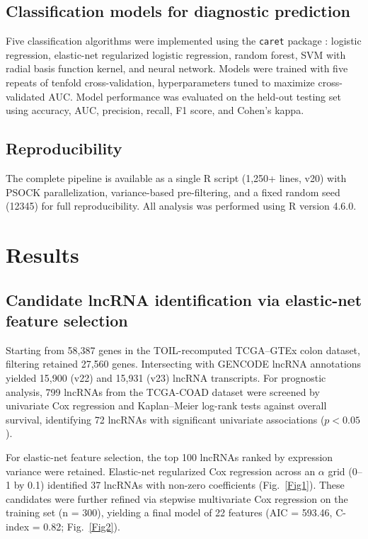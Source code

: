 \documentclass[11pt,a4paper]{article}
\begin{document}
\subsection{Classification models for diagnostic prediction}

Five classification algorithms were implemented using the \texttt{caret} package \citep{RN16}: logistic regression, elastic-net regularized logistic regression, random forest, SVM with radial basis function kernel, and neural network. Models were trained with five repeats of tenfold cross-validation, hyperparameters tuned to maximize cross-validated AUC. Model performance was evaluated on the held-out testing set using accuracy, AUC, precision, recall, F1 score, and Cohen's kappa.

\subsection{Reproducibility}

The complete pipeline is available as a single R script (1,250+ lines, v20) with PSOCK parallelization, variance-based pre-filtering, and a fixed random seed (12345) for full reproducibility. All analysis was performed using R version 4.6.0.

\section{Results}

\subsection{Candidate lncRNA identification via elastic-net feature selection}

Starting from 58,387 genes in the TOIL-recomputed TCGA--GTEx colon dataset, filtering retained 27,560 genes. Intersecting with GENCODE lncRNA annotations yielded 15,900 (v22) and 15,931 (v23) lncRNA transcripts. For prognostic analysis, 799 lncRNAs from the TCGA-COAD dataset were screened by univariate Cox regression and Kaplan--Meier log-rank tests against overall survival, identifying 72 lncRNAs with significant univariate associations ($p < 0.05$).

For elastic-net feature selection, the top 100 lncRNAs ranked by expression variance were retained. Elastic-net regularized Cox regression across an $\alpha$ grid (0--1 by 0.1) identified 37 lncRNAs with non-zero coefficients (Fig.~\ref{Fig1}). These candidates were further refined via stepwise multivariate Cox regression on the training set (n = 300), yielding a final model of 22 features (AIC = 593.46, C-index = 0.82; Fig.~\ref{Fig2}).
\end{document}
